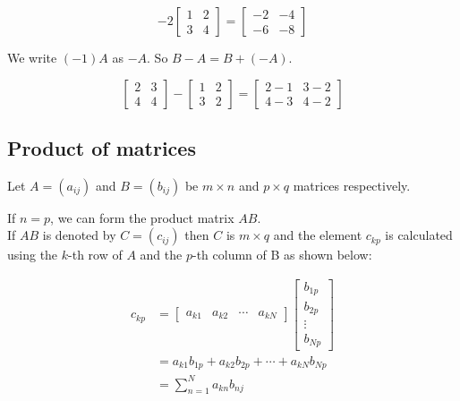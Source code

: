 \documentclass[11pt]{article}
\begin{document}
\begin{displaymath}
-2 \begin{bmatrix}
1 & 2 \\
3 & 4
\end{bmatrix} = \begin{bmatrix}
-2 & -4 \\
-6 & -8
\end{bmatrix}
\end{displaymath}

We write \((-1)A\) as \(-A\). So \(B - A = B + (- A)\).

\begin{displaymath}
\begin{bmatrix}
2 & 3 \\
4 & 4
\end{bmatrix} - \begin{bmatrix}
1 & 2 \\
3 & 2
\end{bmatrix} = \begin{bmatrix}
2 - 1 & 3 - 2 \\
4 - 3 & 4 - 2
\end{bmatrix}
\end{displaymath}

 \newpage

\subsection{Product of matrices}
\label{sec:org4881fcc}
Let \(A = (a_{ij})\) and \(B = (b_{ij})\) be \(m \times n\) and \(p \times q\) matrices respectively.

If \(n = p\), we can form the product matrix \(AB\).
\\[0pt]

If \(AB\) is denoted by \(C = (c_{ij})\) then \(C\) is \(m \times q\) and the element \(c_{kp}\) is calculated using the \(k\)-th row of \(A\) and the \(p\)-th column of B as shown below:

\begin{align*}
c_{kp} &= \begin{bmatrix}
a_{k1} & a_{k2} & \cdots & a_{kN}
\end{bmatrix} \begin{bmatrix}
b_{1p} \\
b_{2p} \\
\vdots \\
b_{Np}
\end{bmatrix} \\
&= a_{k1} b_{1p} + a_{k2} b_{2p} + \cdots + a_{kN} b_{Np} \\
&= \sum_{n=1}^{N} a_{kn} b_{nj}
\end{align*}
\end{document}
